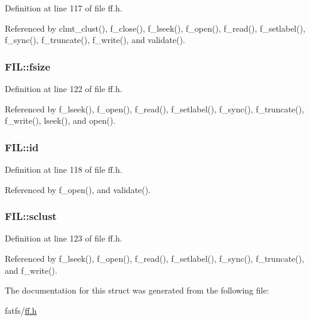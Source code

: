 Definition at line 117 of file ff.\+h.



Referenced by clmt\+\_\+clust(), f\+\_\+close(), f\+\_\+lseek(), f\+\_\+open(), f\+\_\+read(), f\+\_\+setlabel(), f\+\_\+sync(), f\+\_\+truncate(), f\+\_\+write(), and validate().

\subsubsection[{\texorpdfstring{fsize}{fsize}}]{ F\+I\+L\+::fsize}\hypertarget{structFIL_aa00790d40d7b0081c345fd4f76e22b70}{}\label{structFIL_aa00790d40d7b0081c345fd4f76e22b70}


Definition at line 122 of file ff.\+h.



Referenced by f\+\_\+lseek(), f\+\_\+open(), f\+\_\+read(), f\+\_\+setlabel(), f\+\_\+sync(), f\+\_\+truncate(), f\+\_\+write(), lseek(), and open().

\subsubsection[{\texorpdfstring{id}{id}}]{ F\+I\+L\+::id}\hypertarget{structFIL_af7cae0063b0045fb7078b560101ba8f2}{}\label{structFIL_af7cae0063b0045fb7078b560101ba8f2}


Definition at line 118 of file ff.\+h.



Referenced by f\+\_\+open(), and validate().

\subsubsection[{\texorpdfstring{sclust}{sclust}}]{ F\+I\+L\+::sclust}\hypertarget{structFIL_ad308b74c8d6975c6a9c30d90b4124c40}{}\label{structFIL_ad308b74c8d6975c6a9c30d90b4124c40}


Definition at line 123 of file ff.\+h.



Referenced by f\+\_\+lseek(), f\+\_\+open(), f\+\_\+read(), f\+\_\+setlabel(), f\+\_\+sync(), f\+\_\+truncate(), and f\+\_\+write().



The documentation for this struct was generated from the following file\+:\begin{DoxyCompactItemize}
\item 
fatfs/\hyperlink{ff_8h}{ff.\+h}\end{DoxyCompactItemize}
